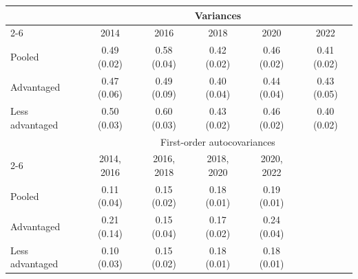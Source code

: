 \begin{tabular}{@{}lccccc@{}}
\toprule
& \multicolumn{5}{c}{Variances} \\
\cmidrule(lr){2-6}
& 2014 & 2016 & 2018 & 2020 & 2022 \\
\midrule
Pooled & 0.49 (0.02) & 0.58 (0.04) & 0.42 (0.02) & 0.46 (0.02) & 0.41 (0.02) \\
Advantaged & 0.47 (0.06) & 0.49 (0.09) & 0.40 (0.04) & 0.44 (0.04) & 0.43 (0.05) \\
Less advantaged & 0.50 (0.03) & 0.60 (0.03) & 0.43 (0.02) & 0.46 (0.02) & 0.40 (0.02) \\
\midrule
& \multicolumn{5}{c}{First-order autocovariances} \\
\cmidrule(lr){2-6}
& 2014, 2016 & 2016, 2018 & 2018, 2020 & 2020, 2022 & \\
\midrule
Pooled & 0.11 (0.04) & 0.15 (0.02) & 0.18 (0.01) & 0.19 (0.01) & \\
Advantaged & 0.21 (0.14) & 0.15 (0.04) & 0.17 (0.02) & 0.24 (0.04) & \\
Less advantaged & 0.10 (0.03) & 0.15 (0.02) & 0.18 (0.01) & 0.18 (0.01) & \\
\bottomrule
\end{tabular}
